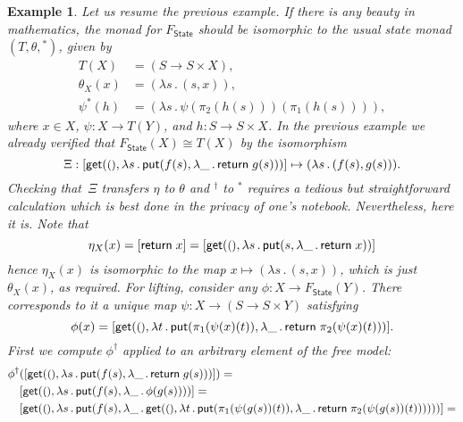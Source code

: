 \documentclass{amsart}
\newcommand{\theory}[1]{\mathsf{#1}} %
\newcommand{\Free}[2]{F_{\theory{#1}}(#2)} %
\newcommand{\FreeFun}[1]{F_{\theory{#1}}} %
\newcommand{\lam}[1]{\lambda #1 \,.\,}
\newcommand{\unit}{{\text{\small$()$}}} %
\newcommand{\lift}[1]{#1^\dagger} %
\newcommand{\kode}[1]{\mathsf{#1}}
\newcommand{\opcall}[3]{\kode{#1}(#2, #3)}
\newcommand{\return}[1]{\kode{return}\;#1}
\newtheorem{example}{Example}[section]
\begin{document}
\begin{example}
  Let us resume the previous example. If there is any beauty in mathematics, the
  monad for $\FreeFun{State}$ should be isomorphic to the usual state monad
  $(T, \theta, {}^{*})$, given by
  \begin{align*}
    T(X) &= (S \to S \times X), \\
    \theta_X(x) &= (\lam{s} (s, x)), \\
    \psi^{*}(h) &= (\lam{s} \psi (\pi_2 (h(s))) (\pi_1 (h(s)))),
  \end{align*}
  where $x \in X$, $\psi : X \to T(Y)$, and $h : S \to S \times X$. In the
  previous example we already verified that $\FreeFun{State}(X) \cong T(X)$ by
  the isomorphism
  \begin{equation*}
    \Xi :
    [\opcall{get}{\unit}{\lam{s} \opcall{put}{f(s)}{\lam{\_} \return{g(s)}}}]
    \mapsto
    (\lam{s} (f(s), g(s))).
  \end{equation*}
  Checking that~$\Xi$ transfers $\eta$ to $\theta$ and
  $\lift{{}}$ to ${}^{*}$ requires a tedious but straightforward calculation
  which is best done in the privacy of one's notebook. Nevertheless, here it is.
  Note that
  \begin{equation*}
    \eta_X(x) = [\return{x}] = [\opcall{get}{\unit}{\lam{s} \opcall{put}{s}{\lam{\_} \return{x}}}]
  \end{equation*}
  hence $\eta_X(x)$ is isomorphic to the map $x \mapsto (\lam{s} (s, x))$, which is
  just $\theta_X(x)$, as required. For lifting, consider any $\phi : X \to \Free{State}{Y}$.
  There corresponds to it a unique map $\psi : X \to (S \to S \times Y)$ satisfying
  \begin{equation*}
    \phi(x) = [\opcall{get}{\unit}{\lam{t} \opcall{put}{\pi_1(\psi(x)(t))}{\lam{\_} \return{\pi_2(\psi(x)(t)}}}].
  \end{equation*}
  First we compute $\lift{\phi}$ applied to an arbitrary element of the free model:
  \begin{align*}
    \lift{\phi}&([\opcall{get}{\unit}{\lam{s} \opcall{put}{f(s)}{\lam{\_} \return{g(s)}}}]) = \\
    &[\opcall{get}{\unit}{\lam{s} \opcall{put}{f(s)}{\lam{\_} \phi(g(s))}}] = \\
    &[\opcall{get}{\unit}{
      \lam{s}
      \opcall{put}{f(s)}{
        \lam{\_}
        \opcall{get}{\unit}{\lam{t} \opcall{put}{\pi_1 (\psi(g(s))(t))}{\lam{\_} \return{\pi_2 (\psi(g(s))(t))}}}
      }
     }] = \\

\end{align*}
\end{example}
\end{document}
